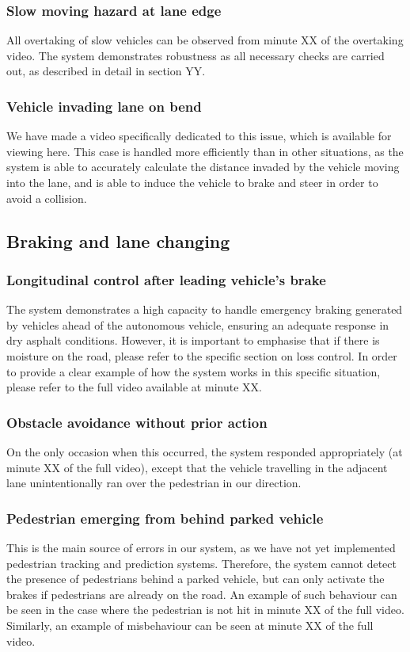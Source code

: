 \documentclass{article}
\begin{document}
\subsubsection{Slow moving hazard at lane edge}
All overtaking of slow vehicles can be observed from minute XX of the overtaking video. The system demonstrates robustness as all necessary checks are 
carried out, as described in detail in section YY.
\subsubsection{Vehicle invading lane on bend}
We have made a video specifically dedicated to this issue, which is available for viewing here. This case is handled more efficiently than in other situations, 
as the system is able to accurately calculate the distance invaded by the vehicle moving into the lane, and is able to induce the vehicle to brake and steer in 
order to avoid a collision.

\subsection{Braking and lane changing}
\subsubsection{Longitudinal control after leading vehicle’s brake}
The system demonstrates a high capacity to handle emergency braking generated by vehicles ahead of the autonomous vehicle, ensuring an adequate response in 
dry asphalt conditions. However, it is important to emphasise that if there is moisture on the road, please refer to the specific section on loss control. 
In order to provide a clear example of how the system works in this specific situation, please refer to the full video available at minute XX.
\subsubsection{Obstacle avoidance without prior action}
On the only occasion when this occurred, the system responded appropriately (at minute XX of the full video), except that the vehicle travelling in the adjacent 
lane unintentionally ran over the pedestrian in our direction.
\subsubsection{Pedestrian emerging from behind parked vehicle}
This is the main source of errors in our system, as we have not yet implemented pedestrian tracking and prediction systems. Therefore, the system cannot detect 
the presence of pedestrians behind a parked vehicle, but can only activate the brakes if pedestrians are already on the road. An example of such behaviour can 
be seen in the case where the pedestrian is not hit in minute XX of the full video. Similarly, an example of misbehaviour can be seen at minute XX of the full video.
\end{document}
